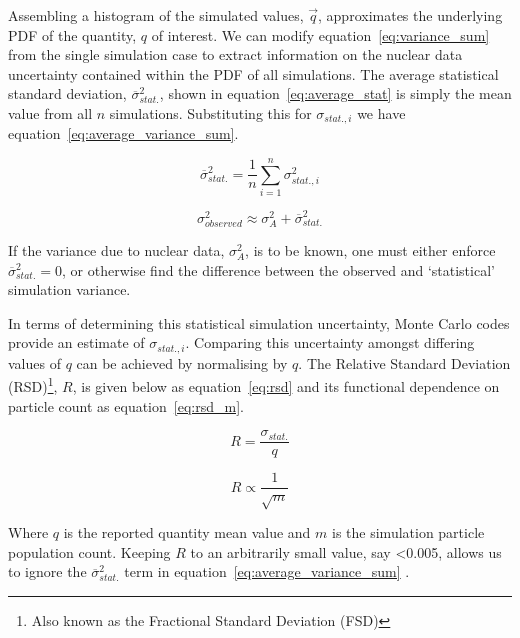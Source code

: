 Assembling a histogram of the simulated values, $\vec{q}$, approximates the underlying PDF of the quantity, $q$ of interest. We can modify equation~\ref{eq:variance_sum} from the single simulation case to extract information on the nuclear data uncertainty contained within the PDF of all simulations. The average statistical standard deviation, $\overline{\sigma}_{stat.}^{2}$, shown in equation~\ref{eq:average_stat} is simply the mean value from all $n$ simulations. Substituting this for $\sigma_{stat.,i}$ we have equation~\ref{eq:average_variance_sum}. 

\begin{equation}
  \label{eq:average_stat}
  \overline{\sigma}_{stat.}^{2} = \frac{1}{n} \sum^{n}_{i=1}\sigma^{2}_{stat.,i}
\end{equation}

\begin{equation}
  \label{eq:average_variance_sum}
  \sigma_{observed}^{2} \approx \sigma_{A}^{2} + \overline{\sigma}_{stat.}^{2}
\end{equation}

If the variance due to nuclear data, $\sigma_{A}^{2}$, is to be known, one must either enforce $\overline{\sigma}_{stat.}^{2} = 0$, or otherwise find the difference between the observed and `statistical' simulation variance. 

In terms of determining this statistical simulation uncertainty, Monte Carlo codes provide an estimate of $\sigma_{stat.,i}$. Comparing this uncertainty amongst differing values of $q$ can be achieved by normalising by $q$. The Relative Standard Deviation (RSD)\footnote{Also known as the Fractional Standard Deviation (FSD)}, $R$, is given below as equation~\ref{eq:rsd} and its functional dependence on particle count as equation~\ref{eq:rsd_m}.

\begin{equation}
  \label{eq:rsd}
  R = \frac{\sigma_{stat.}}{q}
\end{equation}

\begin{equation}
  \label{eq:rsd_m}
  R \propto \frac{1}{\sqrt{m}}
\end{equation}

Where $q$ is the reported quantity mean value and $m$ is the simulation particle population count. Keeping $R$ to an arbitrarily small value, say <0.005, allows us to ignore the $\overline{\sigma}_{stat.}^{2}$ term in equation~\ref{eq:average_variance_sum} \cite{Rochman2014a}.

